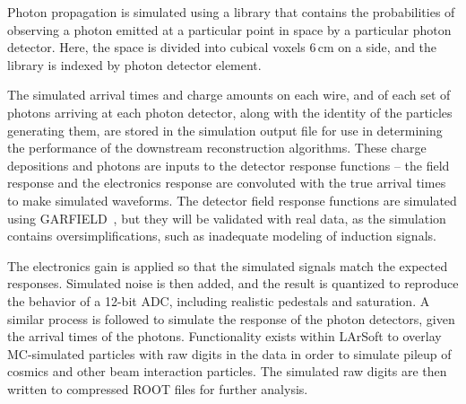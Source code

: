Photon propagation is simulated using a library that contains the
probabilities of observing a photon emitted at a particular point in
space by a particular photon detector.  Here, the space is divided
into cubical voxels 6\,cm on a side, and the library is indexed by photon
detector element. 

The simulated arrival times and charge amounts on each wire, and of
each set of photons arriving at each photon detector, along with the
identity of the particles generating them, are stored in the
simulation output file for use in determining the performance of the
downstream reconstruction algorithms.  These charge depositions and
photons are inputs to the detector response functions -- the field
response and the electronics response are convoluted with the true
arrival times to make simulated waveforms.  The detector field
response functions are simulated using GARFIELD~\cite{garfield}, but
they will be validated with real data, as the simulation contains
oversimplifications, such as inadequate modeling of induction signals.  

The electronics gain is applied so that the
simulated signals match the expected responses.  Simulated noise is
then added, and the result is quantized to reproduce the behavior of a
12-bit ADC, including realistic pedestals and saturation.  A similar
process is followed to simulate the response of the photon detectors,
given the arrival times of the photons.  Functionality exists within
LArSoft to overlay MC-simulated particles with raw digits in
the data in order to simulate pileup of cosmics and other beam
interaction particles. The simulated raw digits are then written to
compressed ROOT files for further analysis.

